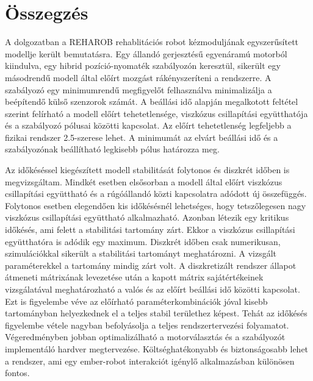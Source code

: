 \chapter{Összegzés}\label{chap:summary}

A dolgozatban a REHAROB rehablitációs robot kézmoduljának egyszerűsített modellje került bemutatásra. Egy állandó 
gerjesztésű egyenáramú motorból kiindulva, egy hibrid pozíció-nyomaték szabályozón keresztül, sikerült egy másodrendű 
modell által előírt mozgást rákényszeríteni a rendszerre. A szabályozó egy minimumrendű megfigyelőt 
felhasználva minimalizálja a beépítendő külső szenzorok számát. A beállási idő alapján megalkotott feltétel 
szerint felírható a modell előírt tehetetlensége, viszkózus csillapítási együtthatója és a szabályozó 
pólusai közötti kapcsolat. Az előírt tehetetlenség legfeljebb a fizikai rendszer 2.5-szerese lehet. A minimumát az 
elvárt beállási idő és a szabályozónak beállítható legkisebb pólus határozza meg. 

Az időkéséssel kiegészített modell stabilitását folytonos és diszkrét időben is megvizsgáltam. Mindkét 
esetben elsősorban a modell által előírt viszkózus csillapítási együttható és a rúgóállandó közti 
kapcsolatra adódott új összefüggés. Folytonos esetben elegendően kis időkésésnél lehetséges, hogy tetszőlegesen 
nagy viszkózus csillapítási együttható alkalmazható. Azonban létezik egy kritikus időkésés, ami felett 
a stabilitási tartomány zárt. Ekkor a viszkózus csillapítási együtthatóra is adódik egy maximum. Diszkrét időben csak numerikusan, szimulációkkal sikerült a stabilitási tartományt
meghatározni. A vizsgált paraméterekkel a tartomány mindig zárt volt. A diszkretizált rendszer állapot átmeneti mátrixának 
levezetése után a kapott mátrix sajátértékeinek
vizsgálatával meghatározható a valós és az előírt beállási idő közötti kapcsolat. Ezt is figyelembe véve az 
előírható paraméterkombinációk jóval kisebb tartományban helyezkednek el a teljes stabil területhez képest. Tehát 
az időkésés figyelembe vétele nagyban befolyásolja a teljes rendszertervezési folyamatot. Végeredményben jobban 
optimalizálható a motorválasztás és a szabályozót implementáló hardver megtervezése. Költséghatékonyabb és biztonságosabb 
lehet a rendszer, ami egy ember-robot interakciót igénylő alkalmazásban különösen fontos. 

